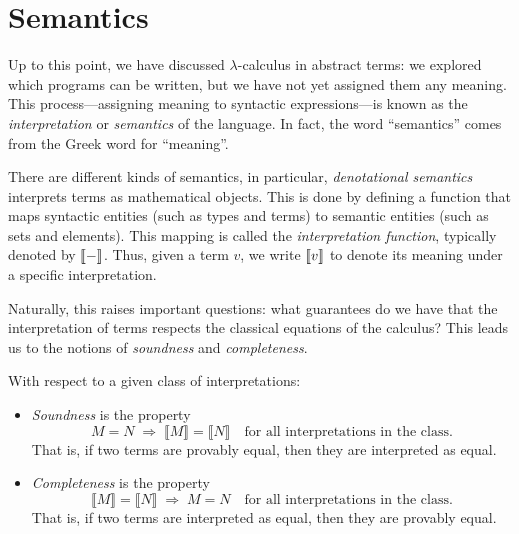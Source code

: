  

 










\section{Semantics} \label{sec: Lambda Calculus:Interpretation}


Up to this point, we have discussed $\lambda$-calculus in abstract terms: we explored which programs can be written, but we have not yet assigned them any meaning. This process—assigning meaning to syntactic expressions—is known as the \emph{interpretation} or \emph{semantics} of the language. In fact, the word ``semantics'' comes from the Greek word for ``meaning''.

There are different kinds of semantics, in particular, \emph{denotational semantics} interprets terms as mathematical objects. This is done by defining a function that maps syntactic entities (such as types and terms) to semantic entities (such as sets and elements). This mapping is called the \emph{interpretation function}, typically denoted by $\left \llbracket - \right \rrbracket$. Thus, given a term $v$, we write $\left \llbracket v \right \rrbracket$ to denote its meaning under a specific interpretation.

Naturally, this raises important questions: what guarantees do we have that the interpretation of terms respects the classical equations of the calculus? This leads us to the notions of \emph{soundness} and \emph{completeness}.

With respect to a given class of interpretations:
\begin{itemize}
  \item \emph{Soundness} is the property 
  \[
  M = N \;\Rightarrow\; \llbracket M \rrbracket = \llbracket N \rrbracket
  \quad \text{for all interpretations in the class.}
  \]
  That is, if two terms are provably equal, then they are interpreted as equal.
  
  \item \emph{Completeness} is the property 
  \[
  \llbracket M \rrbracket = \llbracket N \rrbracket
  \;\Rightarrow\; M = N
  \quad \text{for all interpretations in the class.}
  \]
  That is, if two terms are interpreted as equal, then they are provably equal.
\end{itemize}


